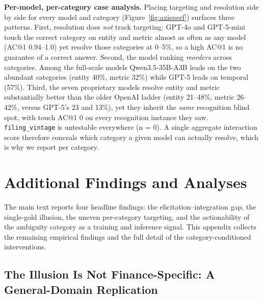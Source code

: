 \textbf{Per-model, per-category case analysis.} Placing targeting and resolution side by
side for every model and category (Figure~\ref{fig:axisperf}) surfaces three patterns.
First, resolution does \emph{not} track targeting: GPT-4o and GPT-5-mini touch the
correct category on entity and metric almost as often as any model (AC@1 0.94--1.0)
yet resolve those categories at 0--5\%, so a high AC@1 is no guarantee of a correct
answer. Second, the model ranking \emph{reorders} across categories. Among the full-scale
models Qwen3.5-35B-A3B leads on the two abundant categories (entity 40\%, metric 32\%)
while GPT-5 leads on temporal (57\%). Third, the seven proprietary models resolve
entity and metric substantially better than the older OpenAI ladder (entity
21--48\%, metric 26--42\%, versus GPT-5's 23 and 13\%), yet they inherit the
\emph{same} recognition blind spot, with touch AC@1 0 on every recognition instance
they saw. \texttt{filing\_vintage} is untestable everywhere (n = 0). A single
aggregate interaction score therefore conceals which category a given model can actually
resolve, which is why we report per category.

\section{Additional Findings and Analyses}
\label{app:findings}

The main text reports four headline findings: the elicitation--integration gap, the single-gold illusion, the uneven per-category targeting, and the actionability of the ambiguity category as a training and inference signal. This appendix collects the remaining empirical findings and the full detail of the category-conditioned interventions.

\subsection{The Illusion Is Not Finance-Specific: A General-Domain Replication}
\label{sec:general}

